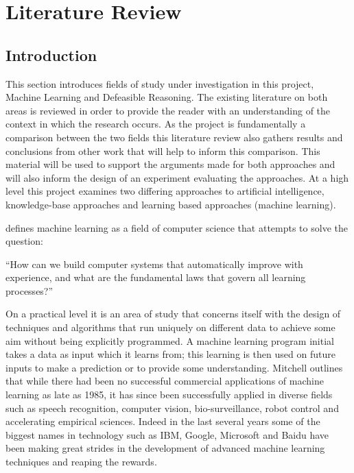 
\chapter{Literature Review} %

\label{Chapter2} %



\section{Introduction}

This section introduces fields of study under investigation in this project, Machine Learning and Defeasible Reasoning. The existing literature on both areas is reviewed in order to provide the reader with an understanding of the context in which the research occurs. As the project is fundamentally a comparison between the two fields this literature review also gathers results and conclusions from other work that will help to inform this comparison. This material will be used to support the arguments made for both approaches and will also inform the design of an experiment evaluating the approaches. At a high level this project examines two differing approaches to artificial intelligence, knowledge-base approaches and learning based approaches (machine learning).

\cite{mitchell2006discipline} defines machine learning as a field of computer science that attempts to solve the question:

``How can we build computer systems that automatically improve with experience, and what are the fundamental laws that govern all learning processes?''

On a practical level it is an area of study that concerns itself with the design of techniques and algorithms that run uniquely on different data to achieve some aim without being explicitly programmed. A machine learning program initial takes a data as input which it learns from; this learning is then used on future inputs to make a prediction or to provide some understanding. Mitchell outlines that while there had been no successful commercial applications of machine learning as late as 1985, it has since been successfully applied in diverse fields such as speech recognition, computer vision, bio-surveillance, robot control and accelerating empirical sciences. Indeed in the last several years some of the biggest names in technology such as IBM, Google, Microsoft and Baidu have been making great strides in the development of advanced machine learning techniques and reaping the rewards.

